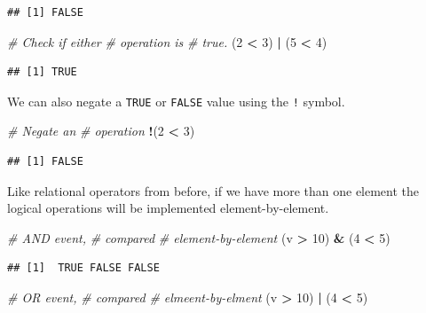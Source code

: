\documentclass[
]{book}
\newenvironment{Shaded}{\begin{snugshade}}{\end{snugshade}}
\newcommand{\CommentTok}[1]{\textcolor[rgb]{0.56,0.35,0.01}{\textit{#1}}}
\newcommand{\DecValTok}[1]{\textcolor[rgb]{0.00,0.00,0.81}{#1}}
\newcommand{\NormalTok}[1]{#1}
\newcommand{\OperatorTok}[1]{\textcolor[rgb]{0.81,0.36,0.00}{\textbf{#1}}}
\newcommand{\StringTok}[1]{\textcolor[rgb]{0.31,0.60,0.02}{#1}}
\begin{document}
\begin{verbatim}
## [1] FALSE
\end{verbatim}

\begin{Shaded}
\begin{Highlighting}[]
\CommentTok{# Check if either}
\CommentTok{# operation is}
\CommentTok{# true.}
\NormalTok{(}\DecValTok{2} \OperatorTok{<}\StringTok{ }\DecValTok{3}\NormalTok{) }\OperatorTok{|}\StringTok{ }\NormalTok{(}\DecValTok{5} \OperatorTok{<}\StringTok{ }\DecValTok{4}\NormalTok{)}
\end{Highlighting}
\end{Shaded}

\begin{verbatim}
## [1] TRUE
\end{verbatim}

We can also negate a \texttt{TRUE} or \texttt{FALSE} value using the \texttt{!} symbol.

\begin{Shaded}
\begin{Highlighting}[]
\CommentTok{# Negate an}
\CommentTok{# operation}
\OperatorTok{!}\NormalTok{(}\DecValTok{2} \OperatorTok{<}\StringTok{ }\DecValTok{3}\NormalTok{)}
\end{Highlighting}
\end{Shaded}

\begin{verbatim}
## [1] FALSE
\end{verbatim}

Like relational operators from before, if we have more than one element the logical operations will be implemented element-by-element.

\begin{Shaded}
\begin{Highlighting}[]
\CommentTok{# AND event,}
\CommentTok{# compared}
\CommentTok{# element-by-element}
\NormalTok{(v }\OperatorTok{>}\StringTok{ }\DecValTok{10}\NormalTok{) }\OperatorTok{&}\StringTok{ }\NormalTok{(}\DecValTok{4} \OperatorTok{<}\StringTok{ }\DecValTok{5}\NormalTok{)}
\end{Highlighting}
\end{Shaded}

\begin{verbatim}
## [1]  TRUE FALSE FALSE
\end{verbatim}

\begin{Shaded}
\begin{Highlighting}[]
\CommentTok{# OR event,}
\CommentTok{# compared}
\CommentTok{# elmeent-by-elment}
\NormalTok{(v }\OperatorTok{>}\StringTok{ }\DecValTok{10}\NormalTok{) }\OperatorTok{|}\StringTok{ }\NormalTok{(}\DecValTok{4} \OperatorTok{<}\StringTok{ }\DecValTok{5}\NormalTok{)}
\end{Highlighting}
\end{Shaded}
\end{document}
